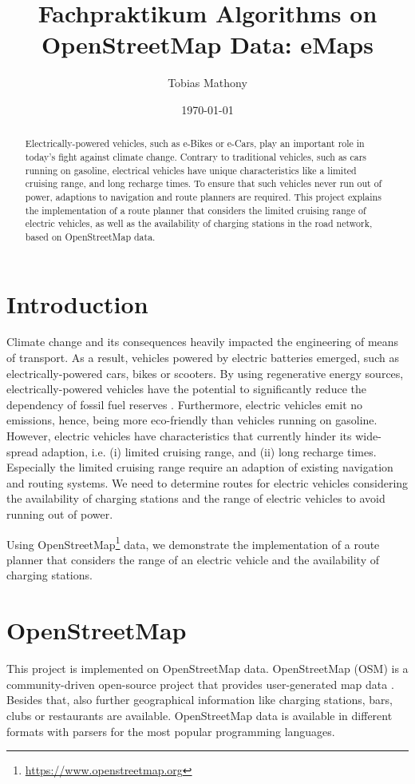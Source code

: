 \documentclass[a4paper]{article}
\author{Tobias Mathony}
\title{Fachpraktikum Algorithms on OpenStreetMap Data: eMaps}
\date{\today}
\begin{document}
\maketitle
\begin{abstract}
Electrically-powered vehicles, such as e-Bikes or e-Cars, play an important role in today's fight against climate change.
Contrary to traditional vehicles, such as cars running on gasoline, electrical vehicles have unique characteristics like a limited cruising range, and long recharge times.
To ensure that such vehicles never run out of power, adaptions to navigation and route planners are required.
This project explains the implementation of a route planner that considers the limited cruising range of electric vehicles, as well as the availability of charging stations in the road network, based on OpenStreetMap data. 
\end{abstract}
\section{Introduction}
Climate change and its consequences heavily impacted the engineering of means of transport.
As a result, vehicles powered by electric batteries emerged, such as electrically-powered cars, bikes or scooters.
By using regenerative energy sources, electrically-powered vehicles have the potential to significantly reduce the dependency of fossil fuel reserves \cite{Artmeier2010}.
Furthermore, electric vehicles emit no emissions, hence, being more eco-friendly than vehicles running on gasoline.
However, electric vehicles have characteristics that currently hinder its wide-spread adaption, i.e. (i) limited cruising range, and (ii) long recharge times\cite{Artmeier2010}.
Especially the limited cruising range require an adaption of existing navigation and routing systems.
We need to determine routes for electric vehicles considering the availability of charging stations and the range of electric vehicles to avoid running out of power.\par\medskip
Using OpenStreetMap\footnote{\url{https://www.openstreetmap.org}} data, we demonstrate the implementation of a route planner that considers the range of an electric vehicle and the availability of charging stations. 
\section{OpenStreetMap}
This project is implemented on OpenStreetMap data.
OpenStreetMap (OSM) is a community-driven open-source project that provides user-generated map data \cite{Haklay2008}.
Besides that, also further geographical information like charging stations, bars, clubs or restaurants are available.
OpenStreetMap data is available in different formats with parsers for the most popular programming languages.\par\medskip
\end{document}
